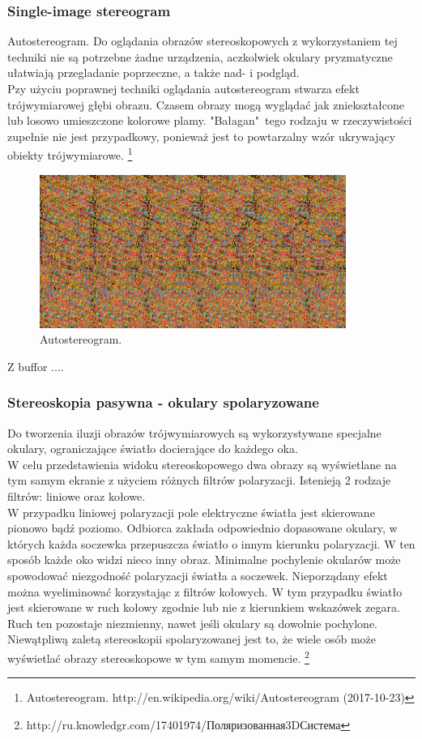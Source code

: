 \subsubsection{Single-image stereogram} 
\begin{itemize}
\itemi Autostereogram. Do oglądania obrazów stereoskopowych z wykorzystaniem tej techniki nie są potrzebne żadne urządzenia, aczkolwiek okulary pryzmatyczne ułatwiają przegladanie poprzeczne, a także nad- i podgląd.\\
Pzy użyciu poprawnej techniki oglądania autostereogram stwarza efekt trójwymiarowej głębi obrazu. Czasem obrazy mogą wyglądać jak zniekształcone lub losowo umieszczone kolorowe plamy. "Bałagan"\ tego rodzaju w rzeczywistości zupełnie nie jest przypadkowy, ponieważ jest to powtarzalny wzór ukrywający obiekty trójwymiarowe. \footnote{Autostereogram. http://en.wikipedia.org/wiki/Autostereogram (2017-10-23)}
\begin{figure}[H]
		\centering
 		\includegraphics[width=10cm]{autostereogram.png}
    	\caption{Autostereogram.}
 		\label{rys1}
\end{figure}

\itemi Z buffor
\itemi ....
\end{itemize}

\subsubsection{Stereoskopia pasywna - okulary spolaryzowane} 
Do tworzenia iluzji obrazów trójwymiarowych są wykorzystywane specjalne okulary, ograniczające światło docierające do każdego oka. \\
W celu przedstawienia widoku stereoskopowego dwa obrazy są wyświetlane na tym samym ekranie z użyciem różnych filtrów polaryzacji. 
Istenieją 2 rodzaje filtrów: liniowe oraz kołowe.\\
W przypadku liniowej polaryzacji pole elektryczne światła jest skierowane pionowo bądź poziomo. Odbiorca zakłada odpowiednio dopasowane okulary, w których każda soczewka przepuszcza światło o innym kierunku polaryzacji. W ten sposób każde oko widzi nieco inny obraz. Minimalne pochylenie okularów może spowodować niezgodność polaryzacji światła a soczewek. Nieporządany efekt można wyeliminować korzystając z filtrów kołowych. W tym przypadku światło jest skierowane w ruch kołowy zgodnie lub nie z kierunkiem wskazówek zegara. Ruch ten pozostaje niezmienny, nawet jeśli okulary są dowolnie pochylone.\\
Niewątpliwą zaletą stereoskopii spolaryzowanej jest to, że wiele osób może wyświetlać obrazy stereoskopowe w tym samym momencie.
\footnote{\foreignlanguage{russian}{http://ru.knowledgr.com/17401974/Поляризованная3DСистема}}

